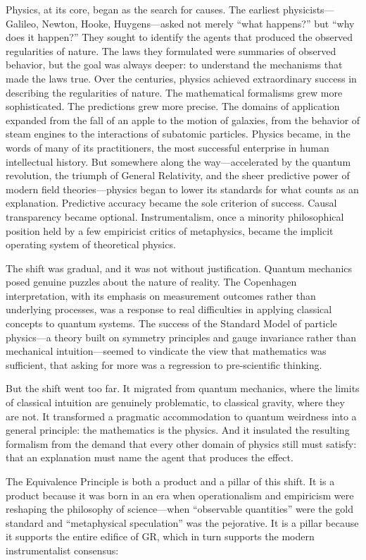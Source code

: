 \documentclass[11pt]{article}
\begin{document}
Physics, at its core, began as the search for causes. The earliest physicists---Galileo, Newton, Hooke, Huygens---asked not merely ``what happens?'' but ``why does it happen?'' They sought to identify the agents that produced the observed regularities of nature. The laws they formulated were summaries of observed behavior, but the goal was always deeper: to understand the mechanisms that made the laws true. Over the centuries, physics achieved extraordinary success in describing the regularities of nature. The mathematical formalisms grew more sophisticated. The predictions grew more precise. The domains of application expanded from the fall of an apple to the motion of galaxies, from the behavior of steam engines to the interactions of subatomic particles. Physics became, in the words of many of its practitioners, the most successful enterprise in human intellectual history. But somewhere along the way---accelerated by the quantum revolution, the triumph of General Relativity, and the sheer predictive power of modern field theories---physics began to lower its standards for what counts as an explanation. Predictive accuracy became the sole criterion of success. Causal transparency became optional. Instrumentalism, once a minority philosophical position held by a few empiricist critics of metaphysics, became the implicit operating system of theoretical physics.

The shift was gradual, and it was not without justification. Quantum mechanics posed genuine puzzles about the nature of reality. The Copenhagen interpretation, with its emphasis on measurement outcomes rather than underlying processes, was a response to real difficulties in applying classical concepts to quantum systems. The success of the Standard Model of particle physics---a theory built on symmetry principles and gauge invariance rather than mechanical intuition---seemed to vindicate the view that mathematics was sufficient, that asking for more was a regression to pre-scientific thinking.

But the shift went too far. It migrated from quantum mechanics, where the limits of classical intuition are genuinely problematic, to classical gravity, where they are not. It transformed a pragmatic accommodation to quantum weirdness into a general principle: the mathematics is the physics. And it insulated the resulting formalism from the demand that every other domain of physics still must satisfy: that an explanation must name the agent that produces the effect.

The Equivalence Principle is both a product and a pillar of this shift. It is a product because it was born in an era when operationalism and empiricism were reshaping the philosophy of science---when ``observable quantities'' were the gold standard and ``metaphysical speculation'' was the pejorative. It is a pillar because it supports the entire edifice of GR, which in turn supports the modern instrumentalist consensus:
\end{document}
